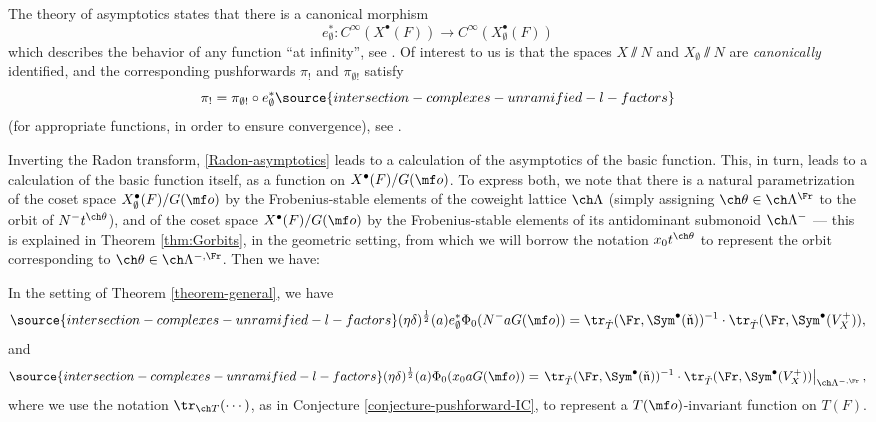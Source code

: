 The theory of asymptotics states that there is a canonical morphism
\[ e_\emptyset^*: C^\infty(X^\bullet(F)) \to C^\infty(X_\emptyset^\bullet(F))\]
which describes the behavior of any function ``at infinity'', see \cite[\S 5]{SV}. Of interest to us is that the spaces $X\sslash N$ and $X_\emptyset\sslash N$ are \emph{canonically} identified, and the corresponding pushforwards $\pi_!$ and $\pi_{\emptyset !}$ satisfy
\begin{equation}\label{Radon-asymptotics} \pi_! = \pi_{\emptyset !} \circ e_\emptyset^*
\source{intersection-complexes-unramified-l-factors}
\end{equation}
 (for appropriate functions, in order to ensure convergence), see
\cite[Proposition 5.4.6]{SV}.

Inverting the Radon transform, \eqref{Radon-asymptotics} leads to a calculation of the asymptotics of the basic function. This, in turn, leads to a calculation of the basic function itself, as a function on $X^\bullet(F)/G(\mf o)$. To express both, we note that there is a natural parametrization of the coset space $X_\emptyset^\bullet(F)/G(\mf o)$ by the Frobenius-stable elements of the coweight lattice $\ch\Lambda$ (simply assigning $\ch\theta \in \ch\Lambda^\Fr$ to the orbit of $N^-t^{\ch\theta}$), and of the coset space $X^\bullet(F)/G(\mf o)$ by the Frobenius-stable elements of its antidominant submonoid $\ch\Lambda^-$ --- this is explained in Theorem \ref{thm:Gorbits}, in the geometric setting, from which we will borrow the notation $x_0 t^{\ch\theta}$ to represent the orbit corresponding to $\ch\theta\in \ch\Lambda^{-,\Fr}$. Then we have:



\begin{cor}
\notready \label{cor:asymptotics}
In the setting of Theorem \ref{theorem-general}, we have
 \begin{equation}
 \label{equation-asymptotics-IC}
\source{intersection-complexes-unramified-l-factors}
(\eta\delta)^\frac{1}{2}(a)  e_\emptyset^* \Phi_0 (N^- a G(\mf o)) = \tr_{\check T}(\Fr, \Sym^\bullet (\check{\mathfrak n}))^{-1} \cdot \tr_{\check T}(\Fr, \Sym^\bullet (V_X^+)) ,
\end{equation}
and
\begin{equation}
 \label{equation-basicfunction}
\source{intersection-complexes-unramified-l-factors}
(\eta\delta)^\frac{1}{2}(a)  \Phi_0 (x_0 a G(\mf o)) = \left. \tr_{\check T}(\Fr, \Sym^\bullet (\check{\mathfrak n}))^{-1} \cdot \tr_{\check T}(\Fr, \Sym^\bullet (V_X^+))\right|_{\ch\Lambda^{-,\Fr}},
\end{equation}
where we use the notation $\tr_{\ch T}(\dotsb)$, as in Conjecture \ref{conjecture-pushforward-IC}, to represent a $T(\mf o)$-invariant function on $T(F)$.
\end{cor}



